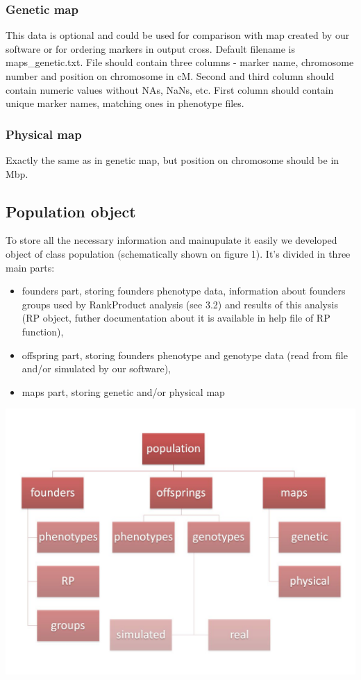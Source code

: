 \documentclass{article}
\begin{document}
\subsubsection{Genetic map}
This data is optional and could be used for comparison with map created by our software or for ordering markers in output cross. Default filename is maps\_genetic.txt. File should contain three columns - marker name, chromosome number and position on chromosome in cM. Second and third column should contain numeric values without NAs, NaNs, etc. First column should contain unique marker names, matching ones in phenotype files.
\subsubsection{Physical map}
Exactly the same as in genetic map, but position on chromosome should be in Mbp.


\subsection{Population object}
\begin{multicols}{2}
To store all the necessary information and mainupulate it easily we developed object of class population (schematically shown on figure 1). It's divided in three main parts:
\begin{itemize}
\item  founders part, storing founders phenotype data, information about founders groups used by RankProduct analysis (see 3.2) and results of this analysis (RP object, futher documentation about it is available in help file of RP function),
\item  offspring part, storing founders phenotype and genotype data (read from file and/or simulated by our software),
\item maps part, storing genetic and/or physical map
\end{itemize}
\includegraphics[scale=0.22]{population.jpg}
 \end{multicols}
\newpage
\end{document}
